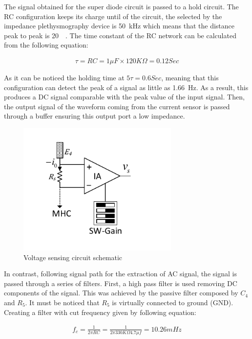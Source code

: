 The signal obtained for the super diode circuit is passed to a hold circuit. The RC configuration keeps its charge until of the circuit, the selected by the impedance plethysmography device is \SI{50}{\kHz} which means that the distance peak to peak is \SI{20}{\micro\sec}. The time constant of the RC network can be calculated from the following equation:

\begin{align}
\tau = RC = 1 \mu F \times 120K\Omega = 0.12 Sec
\end{align}

As it can be noticed the holding time at $5\tau = 0.6 Sec$, meaning that this configuration can detect the peak of a signal as little as \SI{1.66}{\hertz}. As a result, this produces a DC signal comparable with the peak value of the input signal. Then, the output signal of the waveform coming from the current sensor is passed through a buffer ensuring this output port a low impedance. 

\begin{figure}[!htpb]
	\centering
	\includegraphics[width=8cm,keepaspectratio]{figure4}
	\caption{Voltage sensing circuit schematic}
	\label{fig:peak}
\end{figure}


In contrast, following signal path for the extraction of AC signal, the signal is passed through a series of filters. First, a high pass filter is used removing DC components of the signal. This was achieved by the passive filter composed by $C_4$ and $R_5$. It must be noticed that $R_5$ is virtually connected to ground (GND). Creating a filter with cut frequency given by following equation:  

\begin{align}
\label{eg:fc1}
f_c = \frac{1}{2 \pi R C} = \frac{1}{2 \pi 330K\Omega 4.7\mu f}=10.26 mHz
\end{align}

